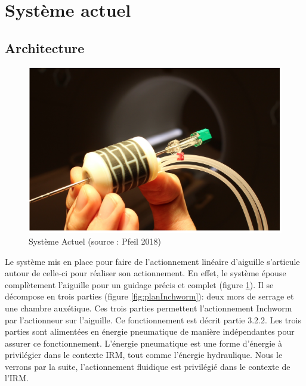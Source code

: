 \documentclass[10pt, a4paper]{article}
\begin{document}
\section{Système actuel} 

    \subsection{Architecture}
    
\begin{figure}[ht!]
\centering
\includegraphics[scale=0.5]{ImageIntro/Inchworm.PNG}
\caption{ Système Actuel (source : Pfeil 2018)}
\label{fig:Inchworm}
\end{figure}   

        \qquad Le système mis en place pour faire de l'actionnement linéaire d'aiguille s'articule autour de celle-ci pour réaliser son actionnement. En effet, le système épouse complètement l'aiguille pour un guidage précis et complet (figure \ref{fig:Inchworm}). Il se décompose en trois parties (figure \ref{fig:planInchworm}): deux mors de serrage et une chambre auxétique. Ces trois parties permettent l'actionnement Inchworm par l'actionneur sur l'aiguille. Ce fonctionnement est décrit partie 3.2.2. Les trois parties sont alimentées en énergie pneumatique de manière indépendantes pour assurer ce fonctionnement. L'énergie pneumatique est une forme d'énergie à privilégier dans le contexte IRM, tout comme l'énergie hydraulique. Nous le verrons par la suite, l'actionnement fluidique est privilégié dans le contexte de l'IRM.
        
\end{document}
